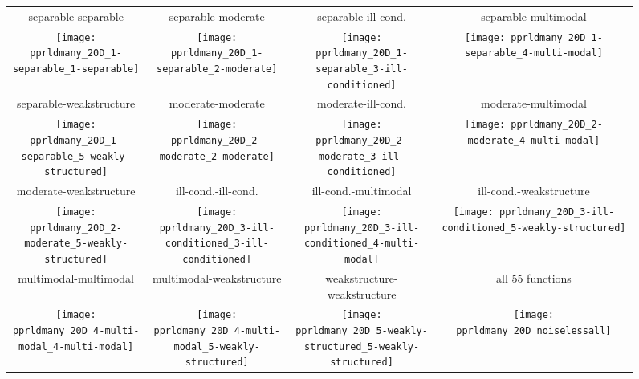 \documentclass[sigconf]{acmart}
\begin{document}



\begin{figure*}
\begin{tabular}{@{\hspace*{-0.00\textwidth}}c@{\hspace*{-0.0\textwidth}}c@{\hspace*{-0.0\textwidth}}c@{\hspace*{-0.0\textwidth}}c}
separable-separable & separable-moderate & separable-ill-cond. & separable-multimodal\\
\texttt{[image: pprldmany\_20D\_1-separable\_1-separable]} &
\texttt{[image: pprldmany\_20D\_1-separable\_2-moderate]} &
\texttt{[image: pprldmany\_20D\_1-separable\_3-ill-conditioned]} &
\texttt{[image: pprldmany\_20D\_1-separable\_4-multi-modal]}\\
separable-weakstructure & moderate-moderate & moderate-ill-cond. & moderate-multimodal\\
\texttt{[image: pprldmany\_20D\_1-separable\_5-weakly-structured]} &
\texttt{[image: pprldmany\_20D\_2-moderate\_2-moderate]} &
\texttt{[image: pprldmany\_20D\_2-moderate\_3-ill-conditioned]} &
\texttt{[image: pprldmany\_20D\_2-moderate\_4-multi-modal]}\\
moderate-weakstructure & ill-cond.-ill-cond. & ill-cond.-multimodal & ill-cond.-weakstructure\\
\texttt{[image: pprldmany\_20D\_2-moderate\_5-weakly-structured]} &
\texttt{[image: pprldmany\_20D\_3-ill-conditioned\_3-ill-conditioned]} &
\texttt{[image: pprldmany\_20D\_3-ill-conditioned\_4-multi-modal]} &
\texttt{[image: pprldmany\_20D\_3-ill-conditioned\_5-weakly-structured]} \\
multimodal-multimodal & multimodal-weakstructure & weakstructure-weakstructure & all 55 functions\\
\texttt{[image: pprldmany\_20D\_4-multi-modal\_4-multi-modal]} &
\texttt{[image: pprldmany\_20D\_4-multi-modal\_5-weakly-structured]} &
\texttt{[image: pprldmany\_20D\_5-weakly-structured\_5-weakly-structured]} &
\texttt{[image: pprldmany\_20D\_noiselessall]}
\vspace*{-0.5ex}
\end{tabular}
 \caption{\label{fig:ECDFsGroupsTwenty}
 }
\end{figure*}
\end{document}
